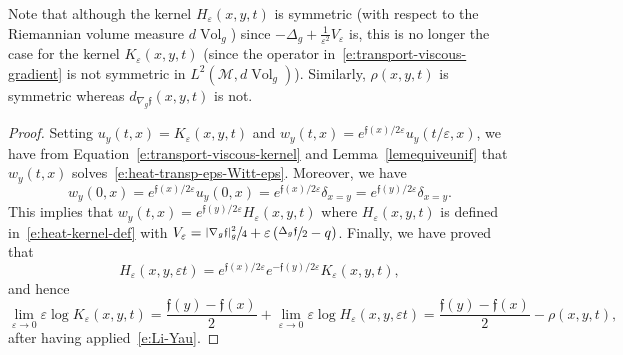 \documentclass[10pt]{amsart}
\theoremstyle{definition}
\newcommand{\M}{\ensuremath{\mathcal M}}
\newcommand{\f}{\ensuremath{\mathfrak{f}}}
\DeclareMathOperator{\Vol}{Vol}
\newcommand\bnp{\begin{proof}}
\newcommand\enp{\end{proof}}
\newcommand\Lap{\Delta_{g}}
\newcommand\nablag{\nabla_{g}}
\let\e\varepsilon
\let\eps\varepsilon
\let\q q
\begin{document}
Note that although the kernel $H_\e(x,y,t)$ is symmetric (with respect to the Riemannian volume measure $d\Vol_g$) since $-\Delta_g+\frac{1}{\e^2} V_\eps$ is, this is no longer the case for the kernel $K_\e(x,y,t)$ (since the operator in~\eqref{e:transport-viscous-gradient} is not symmetric in $L^2(\M,d\Vol_g)$). Similarly, $\rho(x,y,t)$ is symmetric whereas $d_{\nablag \f}(x,y,t)$ is not.

\bnp
Setting $u_y(t,x) = K_{\e}(x,y, t)$ and $w_y(t,x) = e^{\f(x)/2\eps} u_y(t/\eps,x)$, we have from Equation~\eqref{e:transport-viscous-kernel} and Lemma~\ref{lemequiveunif} that $w_y(t,x)$ solves~\eqref{e:heat-transp-eps-Witt-eps}. Moreover, we have
\[
w_y(0,x)= e^{\f(x)/2\eps} u_y(0,x)= e^{\f(x)/2\eps} \delta_{x=y} = e^{\f(y)/2\eps}\delta_{x=y}.
\]
This implies that $w_y (t,x) = e^{\f(y)/2\eps} H_\eps (x,y,t)$ where $H_\eps (x,y,t)$ is defined in~\eqref{e:heat-kernel-def} with $V_\eps = \sfrac{|\nablag \f|_g^2}{4} + \eps \left( \sfrac{\Lap \f}{2}- \q \right)$.
Finally, we have proved that
\[
H_\eps (x,y,\eps t) =e^{\f(x)/2\eps} e^{-\f(y)/2\eps} K_\eps (x,y,t),
\]
and hence
\[
\underset{\e\to 0}{\lim}\e \log K_{\e}(x,y, t)= \frac{\f(y)-\f(x)}{2} +\underset{\e\to 0}{\lim}\e \log H_{\e}(x,y,\eps t)
= \frac{\f(y)-\f(x)}{2} -\rho(x,y,t),
\]
after having applied~\eqref{e:Li-Yau}.
\enp
\end{document}
